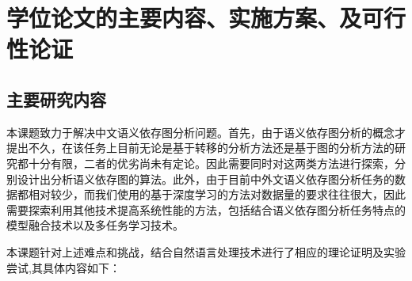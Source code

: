 
\section{学位论文的主要内容、实施方案、及可行性论证}

\subsection{主要研究内容}


本课题致力于解决中文语义依存图分析问题。首先，由于语义依存图分析的概念才提出不久，在该任务上目前无论是基于转移的分析方法还是基于图的分析方法的研究都十分有限，二者的优劣尚未有定论。因此需要同时对这两类方法进行探索，分别设计出分析语义依存图的算法。此外，由于目前中外文语义依存图分析任务的数据都相对较少，而我们使用的基于深度学习的方法对数据量的要求往往很大，因此需要探索利用其他技术提高系统性能的方法，包括结合语义依存图分析任务特点的模型融合技术以及多任务学习技术。

本课题针对上述难点和挑战，结合自然语言处理技术进行了相应的理论证明及实验尝试,其具体内容如下：

